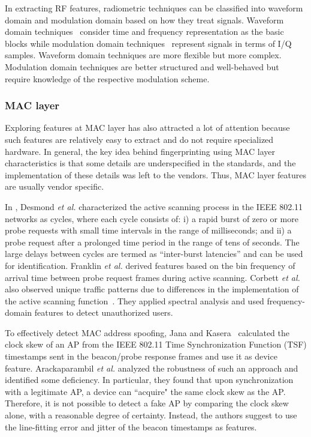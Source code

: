 \documentclass[journal,draftcls,onecolumn,11pt]{IEEEtran}
\newcounter{ctr}\setcounter{ctr}{0}
\begin{document}
In extracting RF features, radiometric techniques can be classified into waveform domain and modulation domain based on how they treat signals\cite{Brik2008}. Waveform domain techniques~\cite{Hall2005,Remley,Sheng,Ureten2007,Polak2011} consider time and frequency representation as the basic blocks while modulation domain techniques~\cite{Brik2008} represent signals  in terms of I/Q samples. Waveform domain techniques are more flexible but more complex. Modulation domain techniques are better structured and well-behaved but require knowledge of the respective modulation scheme.

\subsubsection{MAC layer}

Exploring features at MAC layer has also attracted a lot of attention because such features are relatively easy to extract and do not require specialized hardware. In general, the key idea behind fingerprinting using MAC layer characteristics is that some details are underspecified in the standards, and the implementation of these details was left to the vendors. Thus, MAC layer features are usually vendor specific.

In \cite{Desmond2008}, Desmond {\it et al.} characterized the active scanning process in the IEEE 802.11 networks as cycles, where each cycle consists of: i) a rapid burst of zero or more probe requests with small time intervals in the range of milliseconds; and ii) a probe request after a prolonged time period in the range of tens of seconds. The large delays between cycles are termed as ``inter-burst latencies'' and can be used for identification. Franklin {\it et al.} \cite{Franklin} derived features based on the bin frequency of arrival time between probe request frames during active scanning. Corbett {\it et al.} also observed unique traffic patterns due to differences in the implementation of the active scanning function~\cite{Corbett2006,Corbett2008a}.  They applied spectral analysis and used frequency-domain features to detect unauthorized users.

To effectively detect MAC address spoofing, Jana and Kasera~\cite{Jana} calculated the clock skew of an AP from the IEEE 802.11 Time Synchronization Function (TSF) timestamps sent in the beacon/probe response frames and use it as device feature. Arackaparambil {\it et al.}\cite{Arackaparambil2006} analyzed the robustness of such an approach and identified some deficiency.  In particular, they found that upon synchronization with a legitimate AP, a device can ``acquire" the same clock skew as the AP. Therefore, it is not possible to detect a fake AP by comparing the clock skew alone, with a reasonable degree of certainty.  Instead, the authors suggest to use the line-fitting error and jitter of the beacon timestamps as features.
\end{document}
